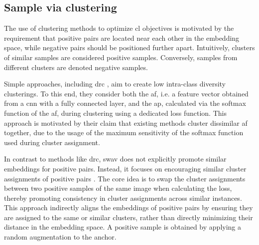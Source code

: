 \subsection{Sample via clustering}
\label{subsec:SampleViaClustering}

The use of clustering methods to optimize \ac{cl} objectives is motivated by 
the requirement that positive pairs are located near each other in the embedding space, 
while negative pairs should be positioned further apart.
Intuitively, clusters of similar samples are considered positive samples.
Conversely, samples from different clusters are denoted negative samples.

Simple approaches, including \ac{drc} \citep{DRC_2020}, aim to create low intra-class diversity clusterings. 
To this end, they consider both the \ac{af}, i.e. a feature vector obtained from a \ac{cnn} with a fully connected layer, 
and the \ac{ap}, calculated via the softmax function of the \ac{af}, 
during clustering using a dedicated loss function.
This approach is motivated by their claim that existing methods cluster dissimilar \ac{af} together,
due to the usage of the maximum sensitivity of the softmax function used during cluster assignment.

In contrast to methods like \ac{drc}, \ac{swav} does not explicitly promote similar embeddings for positive pairs. 
Instead, it focuses on encouraging similar cluster assignments of positive pairs \citep{swav_2020}. 
The core idea is to swap the cluster assignments between two positive samples of the same image when calculating the loss, 
thereby promoting consistency in cluster assignments across similar instances. 
This approach indirectly aligns the embeddings of positive pairs by 
ensuring they are assigned to the same or similar clusters, 
rather than directly minimizing their distance in the embedding space.
A positive sample is obtained by applying a random augmentation to the anchor.





